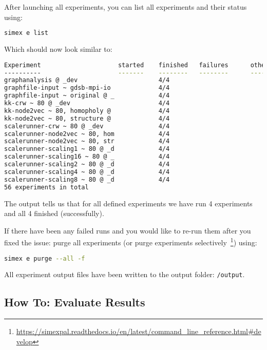 \documentclass[11pt, a4paper]{scrartcl}
\begin{document}
After launching all experiments, you can list all experiments and their status
using:

\begin{lstlisting}[language=bash]
simex e list
\end{lstlisting}

Which should now look similar to:

\begin{lstlisting}[language=bash]
Experiment                     started    finished   failures      other
----------                     -------    --------   --------      -----
graphanalysis @ _dev                      4/4                             
graphfile-input ~ gdsb-mpi-io             4/4                             
graphfile-input ~ original @ _            4/4                             
kk-crw ~ 80 @ _dev                        4/4                             
kk-node2vec ~ 80, homopholy @             4/4                             
kk-node2vec ~ 80, structure @             4/4                             
scalerunner-crw ~ 80 @ _dev               4/4                             
scalerunner-node2vec ~ 80, hom            4/4                             
scalerunner-node2vec ~ 80, str            4/4                             
scalerunner-scaling1 ~ 80 @ _d            4/4                             
scalerunner-scaling16 ~ 80 @ _            4/4                             
scalerunner-scaling2 ~ 80 @ _d            4/4                             
scalerunner-scaling4 ~ 80 @ _d            4/4                             
scalerunner-scaling8 ~ 80 @ _d            4/4                             
56 experiments in total
\end{lstlisting}

The output tells us that for all defined experiments we have run 4 experiments
and all 4 finished (successfully).

If there have been any failed runs and you would like to re-run them after you
fixed the issue: purge all experiments (or purge experiments
selectively~\footnote{\url{https://simexpal.readthedocs.io/en/latest/command\_line\_reference.html\#develop}})
using:

\begin{lstlisting}[language=bash]
simex e purge --all -f
\end{lstlisting}

All experiment output files have been written to the output folder: \texttt{/output}.

\subsection{How To: Evaluate Results}\label{sec:getting_started:eval_results}
\end{document}
